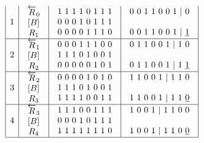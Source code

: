 $$\begin{array}{c}
\begin{array}{|c|c|c|c|}
1 & \begin{array}{c}\overleftarrow{R}_0 \\  \left[B\right]_{\textup{}} \\ R_1\end{array} & \begin{array}{c}1\ 1\ 1\ 1\ 0\ 1\ 1\ 1 \\ 0\ 0\ 0\ 1\ 0\ 1\ 1\ 1 \\ 0\ 0\ 0\ 0\ 1\ 1\ 1\ 0\end{array} & \begin{array}{c}0\ 0\ 1\ 1\ 0\ 0\ 1\ |\ 0 \\  \\ 0\ 0\ 1\ 1\ 0\ 0\ 1\ |\ \underline{1}\end{array} \\ \hline 
2 & \begin{array}{c}\overleftarrow{R}_1 \\  \left[B\right]_{\textup{}} \\ R_2\end{array} & \begin{array}{c}0\ 0\ 0\ 1\ 1\ 1\ 0\ 0 \\ 1\ 1\ 1\ 0\ 1\ 0\ 0\ 1 \\ 0\ 0\ 0\ 0\ 0\ 1\ 0\ 1\end{array} & \begin{array}{c}0\ 1\ 1\ 0\ 0\ 1\ |\ 1\ 0 \\  \\ 0\ 1\ 1\ 0\ 0\ 1\ |\ 1\ \underline{1}\end{array} \\ \hline 
3 & \begin{array}{c}\overleftarrow{R}_2 \\  \left[B\right]_{\textup{}} \\ R_3\end{array} & \begin{array}{c}0\ 0\ 0\ 0\ 1\ 0\ 1\ 0 \\ 1\ 1\ 1\ 0\ 1\ 0\ 0\ 1 \\ 1\ 1\ 1\ 1\ 0\ 0\ 1\ 1\end{array} & \begin{array}{c}1\ 1\ 0\ 0\ 1\ |\ 1\ 1\ 0 \\  \\ 1\ 1\ 0\ 0\ 1\ |\ 1\ 1\ \underline{0}\end{array} \\ \hline 
4 & \begin{array}{c}\overleftarrow{R}_3 \\  \left[B\right]_{\textup{}} \\ R_4\end{array} & \begin{array}{c}1\ 1\ 1\ 0\ 0\ 1\ 1\ 1 \\ 0\ 0\ 0\ 1\ 0\ 1\ 1\ 1 \\ 1\ 1\ 1\ 1\ 1\ 1\ 1\ 0\end{array} & \begin{array}{c}1\ 0\ 0\ 1\ |\ 1\ 1\ 0\ 0 \\  \\ 1\ 0\ 0\ 1\ |\ 1\ 1\ 0\ \underline{0}\end{array} \\ \hline 

\end{array}
\end{array}$$
